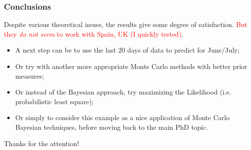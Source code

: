 \documentclass{beamer}
\begin{document}
\begin{frame}
	\frametitle{Conclusions}
	Despite various theoretical issues, the results give some
	degree of satisfaction. \textcolor{red}
	{But they \emph{do not seem} to work
	with Spain, UK (I quickly tested)}.
	\begin{itemize}
		\item<1-> A next step can be to use the last 20 days of data
			to predict for June/July;
		\item<2-> Or try with another more appropriate Monte
			Carlo methods with better prior measures;
		\item<3-> Or instead of the Bayesian approach,
			try maximizing the Likelihood (i.e.
			probabilistic least square);
		\item<4-> Or simply to consider this example as a nice
			application of Monte Carlo Bayesian techniques,
			before moving back to the main PhD topic.
	\end{itemize}
\end{frame}

\begin{frame}
	Thanks for the attention!
\end{frame}
\end{document}
